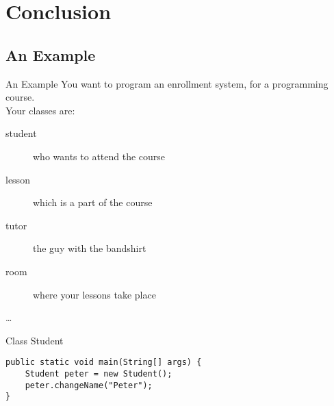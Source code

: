\section{Conclusion}
\subsection{An Example}

\begin{frame}{An Example}
	You want to program an enrollment system, for a programming course. \\
	\vspace{1em}
	Your classes are:\\
	\begin{description}
		\item[student] who wants to attend the course
		\item[lesson] which is a part of the course
		\item[tutor] the guy with the bandshirt
		\item[room] where your lessons take place
		\item[\dots]
	\end{description}
\end{frame}


\begin{frame}[fragile]{Class Student}
\begin{lstlisting}
public static void main(String[] args) {
	Student peter = new Student();
	peter.changeName("Peter");
}
\end{lstlisting}
\end{frame}
\fi

